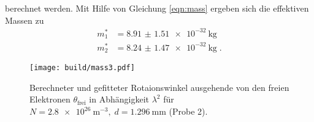 berechnet werden.
Mit Hilfe von Gleichung \eqref{eqn:mass} ergeben sich die effektiven Massen zu
\begin{align*}
    m^*_1&= \qty{8.91(151)e-32}{\kilo\gram} \\
    m^*_2&= \qty{8.24(147)e-32}{\kilo\gram} \; \text{.}
\end{align*} 
\begin{figure}
    \centering
    \texttt{[image: build/mass3.pdf]}
    \caption{Berechneter und gefitteter Rotaionswinkel ausgehende von den freien Elektronen $\theta_\text{frei}$ in Abhängigkeit $\lambda^2$ für $
    N=\qty{2.8e26}{\meter\tothe{-3}}, \; d = \qty{1,296}{\milli\meter}$ (Probe 2).}
    \label{fig:mass3}
\end{figure}